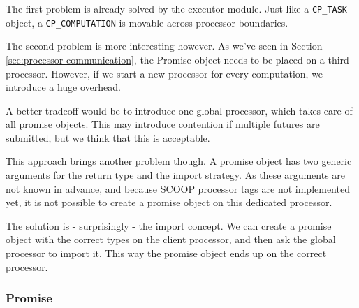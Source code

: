 The first problem is already solved by the executor module. 
Just like a \lstinline!CP_TASK! object, a \lstinline!CP_COMPUTATION! is movable across processor boundaries.

The second problem is more interesting however.
As we've seen in Section \ref{sec:processor-communication}, the Promise object needs to be placed on a third processor.
However, if we start a new processor for every computation, we introduce a huge overhead.

A better tradeoff would be to introduce one global processor, which takes care of all promise objects.
This may introduce contention if multiple futures are submitted, but we think that this is acceptable.

This approach brings another problem though.
A promise object has two generic arguments for the return type and the import strategy.
As these arguments are not known in advance, and because SCOOP processor tags \cite[p. 90]{Nienaltowski07} are not implemented yet, it is not possible to create a promise object on this dedicated processor.

The solution is - surprisingly - the import concept.
We can create a promise object with the correct types on the client processor, and then ask the global processor to import it.
This way the promise object ends up on the correct processor.

% 

\subsubsection{Promise}
\label {sec:promise}

